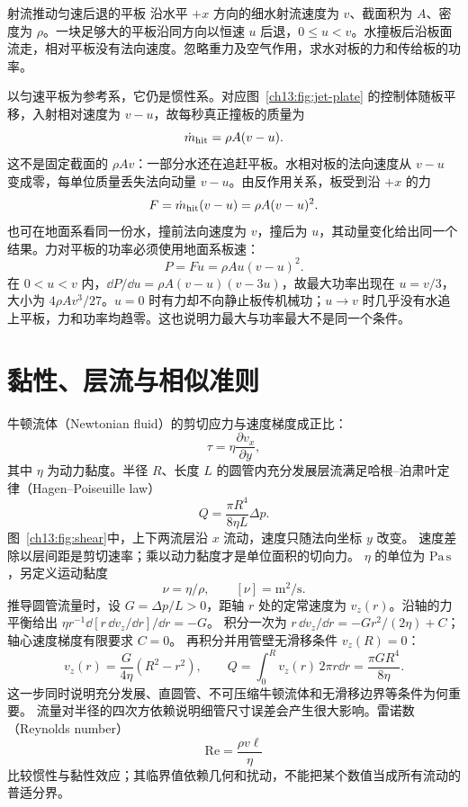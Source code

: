 \begin{origexamplebox}{射流推动匀速后退的平板}\label{ch13:ex:teaching-moving-plate}
沿水平 $+x$ 方向的细水射流速度为 $v$、截面积为 $A$、密度为 $\rho$。一块足够大的平板沿同方向以恒速 $u$ 后退，$0\le u<v$。水撞板后沿板面流走，相对平板没有法向速度。忽略重力及空气作用，求水对板的力和传给板的功率。

\ThQMovingPlate
\end{origexamplebox}
\begin{xesolution}
\ThAMovingPlate

以匀速平板为参考系，它仍是惯性系。对应图~\ref{ch13:fig:jet-plate} 的控制体随板平移，入射相对速度为 $v-u$，故每秒真正撞板的质量为
\[
 \dot m_{\rm hit}=\rho A(v-u).
\]
这不是固定截面的 $\rho Av$：一部分水还在追赶平板。水相对板的法向速度从 $v-u$ 变成零，每单位质量丢失法向动量 $v-u$。由反作用关系，板受到沿 $+x$ 的力
\[
 F=\dot m_{\rm hit}(v-u)=\rho A(v-u)^2.
\]
也可在地面系看同一份水，撞前法向速度为 $v$，撞后为 $u$，其动量变化给出同一个结果。力对平板的功率必须使用地面系板速：
\[
 P=Fu=\rho Au(v-u)^2.
\]
在 $0<u<v$ 内，$\dd P/\dd u=\rho A(v-u)(v-3u)$，故最大功率出现在 $u=v/3$，大小为 $4\rho Av^3/27$。$u=0$ 时有力却不向静止板传机械功；$u\to v$ 时几乎没有水追上平板，力和功率均趋零。这也说明力最大与功率最大不是同一个条件。
\end{xesolution}

\section{黏性、层流与相似准则}\label{ch13:sec:viscosity}

牛顿流体（Newtonian fluid）的剪切应力与速度梯度成正比：
\begin{equation}
 \tau=\eta\frac{\partial v_x}{\partial y},
\end{equation}
其中 $\eta$ 为动力黏度。半径 $R$、长度 $L$ 的圆管内充分发展层流满足哈根--泊肃叶定律（Hagen--Poiseuille law）
\begin{equation}
 Q=\frac{\pi R^4}{8\eta L}\Delta p.
\end{equation}
\FluidShearDiagram
图~\ref{ch13:fig:shear}中，上下两流层沿 $x$ 流动，速度只随法向坐标 $y$ 改变。
速度差除以层间距是剪切速率；乘以动力黏度才是单位面积的切向力。
$\eta$ 的单位为 $\mathrm{Pa\,s}$，另定义运动黏度
\[
 \boxed{\nu=\eta/\rho},\qquad [\nu]=\mathrm{m^2/s}.
\]
推导圆管流量时，设 $G=\Delta p/L>0$，距轴 $r$ 处的定常速度为 $v_z(r)$。沿轴的力平衡给出
$\eta r^{-1}\dd[r\,\dd v_z/\dd r]/\dd r=-G$。
积分一次为 $r\,\dd v_z/\dd r=-Gr^2/(2\eta)+C$；轴心速度梯度有限要求 $C=0$。
再积分并用管壁无滑移条件 $v_z(R)=0$：
\[
 v_z(r)=\frac{G}{4\eta}(R^2-r^2),\qquad
 Q=\int_0^R v_z(r)\,2\pi r\dd r
 =\frac{\pi GR^4}{8\eta}.
\]
这一步同时说明充分发展、直圆管、不可压缩牛顿流体和无滑移边界等条件为何重要。
流量对半径的四次方依赖说明细管尺寸误差会产生很大影响。雷诺数（Reynolds number）
\begin{equation}
 \mathrm{Re}=\frac{\rho v\ell}{\eta}
\end{equation}
比较惯性与黏性效应；其临界值依赖几何和扰动，不能把某个数值当成所有流动的普适分界。

